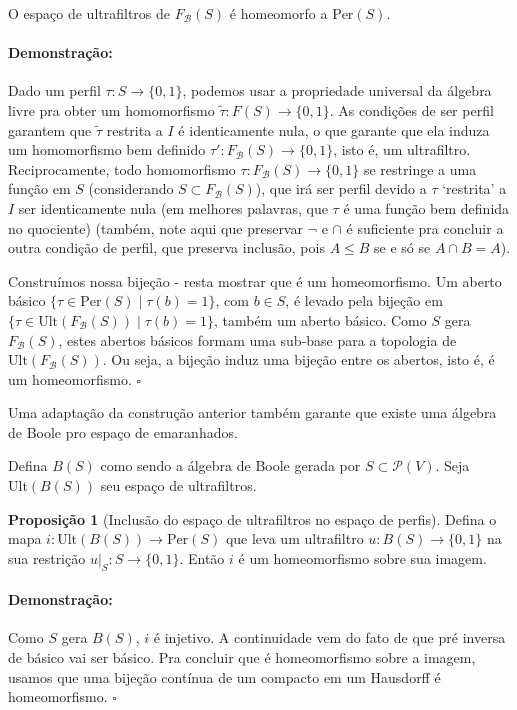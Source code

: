 \documentclass[11pt]{article}
\newcommand{\pulinho}{\vspace{.5cm}}
\theoremstyle{definition}
\theoremstyle{definition}
\theoremstyle{definition}
\newtheorem{prop}{Proposição}
\newenvironment{proposicao}{
\definecolor{shadecolor}{HTML}{FFDBDF}
\begin{shaded}
\begin{prop}
}
{
\end{prop}
\end{shaded}
}
\theoremstyle{definition}
\newtheorem*{prop*}{Proposição}
\newenvironment{proposicao*}{
\definecolor{shadecolor}{HTML}{FFDBDF}
\begin{shaded}
\begin{prop*}
}
{
\end{prop*}
\end{shaded}
}
\theoremstyle{definition}
\theoremstyle{definition}
\theoremstyle{definition}
\theoremstyle{definition}
\theoremstyle{definition}
\theoremstyle{definition}
\theoremstyle{definition}
\theoremstyle{definition}
\newenvironment{prova}{\paragraph{Demonstração:}}{\hfill$\square$ 
\pulinho
}
\theoremstyle{definition}
\theoremstyle{definition}
\newtheorem{preguta}{Pergunta}
\newenvironment{pergunta}{
\definecolor{shadecolor}{HTML}{FFF8F0}
\begin{shaded}
\begin{preguta}
}
{
\end{preguta}
\end{shaded}
}
\begin{document}
\begin{proposicao*}
O espaço de ultrafiltros de $F_{\mathcal{B}}(S)$ é homeomorfo a $\text{Per}(S)$.
\end{proposicao*}
\begin{prova}
Dado um perfil $\tau: S \rightarrow \{0,1\}$, podemos usar a propriedade universal da álgebra livre pra obter um homomorfismo $\tilde{\tau}: F(S) \rightarrow \{0,1\}$. As condições de ser perfil garantem que $\tilde{\tau}$ restrita a $I$ é identicamente nula, o que garante que ela induza um homomorfismo bem definido $\tau': F_{\mathcal{B}}(S) \rightarrow \{0,1\}$, isto é, um ultrafiltro. Reciprocamente, todo homomorfismo $\tau: F_{\mathcal{B}}(S) \rightarrow \{0,1\}$ se restringe a uma função em $S$ (considerando $S \subset F_{\mathcal{B}}(S)$), que irá ser perfil devido a $\tau$ `restrita' a $I$ ser identicamente nula (em melhores palavras, que $\tau$ é uma função bem definida no quociente) (também, note aqui que preservar $\lnot$ e $\cap$ é suficiente pra concluir a outra condição de perfil, que preserva inclusão, pois $A \leq B$ se e só se $A \cap B = A$).

Construímos nossa bijeção - resta mostrar que é um homeomorfismo. Um aberto básico $\{\tau \in \text{Per}(S) \mid \tau(b) = 1\}$, com $b \in S$, é levado pela bijeção em $\{\tau \in \text{Ult}(F_{\mathcal{B}}(S)) \mid \tau(b) = 1\}$, também um aberto básico. Como $S$ gera $F_{\mathcal{B}}(S)$, estes abertos básicos formam uma sub-base para a topologia de $\text{Ult}(F_{\mathcal{B}}(S))$. Ou seja, a bijeção induz uma bijeção entre os abertos, isto é, é um homeomorfismo.
\end{prova}


Uma adaptação da construção anterior também garante que existe uma álgebra de Boole pro espaço de emaranhados.

Defina $B(S)$ como sendo a álgebra de Boole gerada por $S \subset \mathcal{P}(V)$. Seja $\text{Ult}(B(S))$ seu espaço de ultrafiltros.

\begin{proposicao}[Inclusão do espaço de ultrafiltros no espaço de perfis]
  Defina o mapa $i: \text{Ult}(B(S)) \rightarrow \text{Per}(S)$ que leva um ultrafiltro $u: B(S) \rightarrow \{0,1\}$ na sua restrição $u|_{S}: S \rightarrow \{0,1\}$. Então $i$ é um homeomorfismo sobre sua imagem.
\end{proposicao}
\begin{prova}
  Como $S$ gera $B(S)$, $i$ é injetivo. A continuidade vem do fato de que pré inversa de básico vai ser básico. Pra concluir que é homeomorfismo sobre a imagem, usamos que uma bijeção contínua de um compacto em um Hausdorff é homeomorfismo.
\end{prova}
\end{document}
